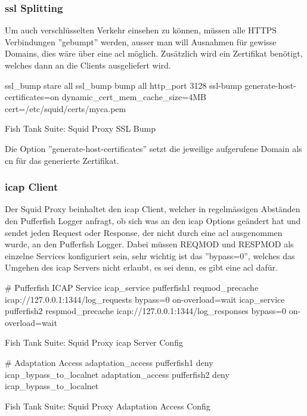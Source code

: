 \subsubsection{\gls{ssl} Splitting}
Um auch verschlüsselten Verkehr einsehen zu können, müssen alle HTTPS Verbindungen ''gebumpt'' werden, ausser man will Ausnahmen für gewisse Domains, dies wäre über eine \gls{acl} möglich.
Zusätzlich wird ein Zertifikat benötigt, welches dann an die Clients ausgeliefert wird.

\begin{listing}[H]
\begin{fancycode}
ssl_bump stare all
ssl_bump bump all
http_port 3128 ssl-bump generate-host-certificates=on dynamic_cert_mem_cache_size=4MB cert=/etc/squid/certs/myca.pem
\end{fancycode}
\caption{Fish Tank Suite: Squid Proxy SSL Bump}
\label{lst:squid-proxy-ssl-bump-config}
\end{listing}

Die Option ''generate-host-certificates'' setzt die jeweilige aufgerufene Domain als \gls{cn} für das generierte Zertifikat. 



\subsubsection{\gls{icap} Client}
Der Squid Proxy beinhaltet den \gls{icap} Client, welcher in regelmässigen Abständen den Pufferfish Logger anfragt, ob sich was an den \gls{icap} Options geändert hat und sendet jeden Request oder Response, der nicht durch eine \gls{acl} ausgenommen wurde, an den Pufferfish Logger.
Dabei müssen REQMOD und RESPMOD als einzelne Services konfiguriert sein, sehr wichtig ist das ''bypass=0'', welches das Umgehen des \gls{icap} Servers nicht erlaubt, es sei denn, es gibt eine \gls{acl} dafür.

\begin{listing}[H]
\begin{fancycode}
# Pufferfish ICAP Service
icap_service pufferfish1 reqmod_precache icap://127.0.0.1:1344/log_requests bypass=0 on-overload=wait
icap_service pufferfish2 respmod_precache icap://127.0.0.1:1344/log_responses bypass=0 on-overload=wait
\end{fancycode}
\caption{Fish Tank Suite: Squid Proxy \gls{icap} Server Config}
\label{lst:squid-proxy-icap-service}
\end{listing}


\begin{listing}[H]
\begin{fancycode}
# Adaptation Access
adaptation_access pufferfish1 deny icap_bypass_to_localnet
adaptation_access pufferfish2 deny icap_bypass_to_localnet
\end{fancycode}
\caption{Fish Tank Suite: Squid Proxy Adaptation Access Config}
\label{lst:squid-proxy-adaptation-access}
\end{listing}

